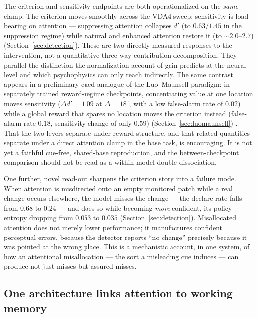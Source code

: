 The criterion and sensitivity endpoints are both operationalized on the
\emph{same} clamp. The criterion moves smoothly across the VDA4 sweep;
sensitivity is load-bearing on attention ---
suppressing attention collapses $d'$ (to $0.63$/$1.45$ in the
suppression regime) while natural and enhanced attention restore it (to
$\sim$$2.0$--$2.7$) (Section~\ref{sec:detection}). These are two directly measured
responses to the intervention, not a quantitative three-way contribution decomposition.
They parallel the distinction the
normalization account of gain predicts at the neural level
\cite{reynolds_heeger2009_normalization, mcadams_maunsell1999_v4_tuning,
treue_martinez_trujillo1999_feature_attention} and which psychophysics
can only reach indirectly. The same contrast appears in a preliminary cued analogue of the
Luo--Maunsell paradigm: in separately trained reward-regime checkpoints, concentrating value at one
location moves sensitivity ($\Delta d' = 1.09$ at $\Delta = 18^{\circ}$,
with a low false-alarm rate of $0.02$) while a global reward that spares
no location moves the criterion instead (false-alarm rate $0.18$,
sensitivity change of only $0.59$) (Section~\ref{sec:luomaunsell})
\cite{luo_maunsell2018_criterion_sensitivity}. That the two levers separate under reward
structure, and that related quantities separate under a direct attention clamp in
the base task, is encouraging. It is not yet a faithful cue-free, shared-base
reproduction, and the between-checkpoint comparison should not be read as a
within-model double dissociation.

One further, novel read-out sharpens the criterion story into a failure
mode. When attention is misdirected onto an empty monitored patch while
a real change occurs elsewhere, the model misses the change --- the
declare rate falls from $0.68$ to $0.24$ --- and does so while becoming
\emph{more} confident, its policy entropy dropping from $0.053$ to
$0.035$ (Section~\ref{sec:detection}). Misallocated attention does not
merely lower performance; it manufactures confident perceptual errors,
because the detector reports ``no change'' precisely because it was
pointed at the wrong place. This is a mechanistic account, in one system,
of how an attentional misallocation --- the sort a misleading cue induces
--- can produce not just misses but assured misses.

\subsection*{One architecture links attention to working memory}

